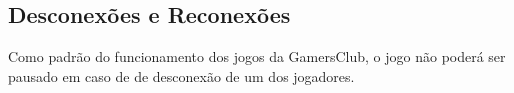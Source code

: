 \subsection{Desconexões e Reconexões}

Como padrão do funcionamento dos jogos da GamersClub, o jogo não poderá ser pausado em caso de de desconexão de um dos jogadores.